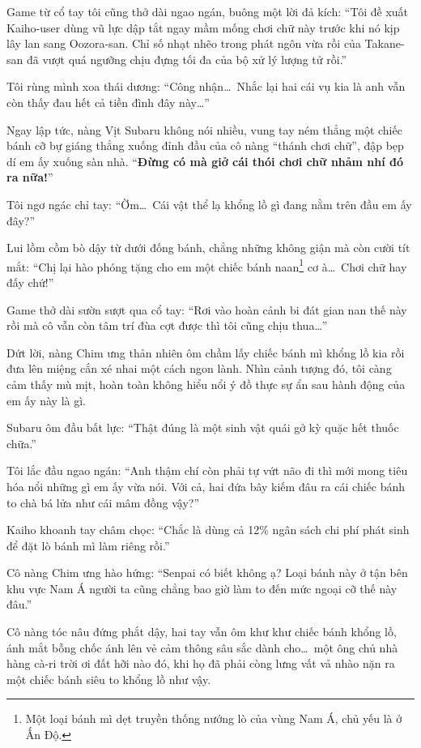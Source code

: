 \documentclass[../main.tex]{subfiles}
\begin{document}
Game từ cổ tay tôi cũng thở dài ngao ngán, buông một lời đả kích: ``Tôi đề xuất Kaiho-user dùng vũ lực dập tắt ngay mầm mống chơi chữ này trước khi nó kịp lây lan sang Oozora-san. Chỉ số nhạt nhẽo trong phát ngôn vừa rồi của Takane-san đã vượt quá ngưỡng chịu đựng tối đa của bộ xử lý lượng tử rồi.''

Tôi rùng mình xoa thái dương: ``Công nhận\dots\ Nhắc lại hai cái vụ kia là anh vẫn còn thấy đau hết cả tiền đình đây này\dots''

Ngay lập tức, nàng Vịt Subaru không nói nhiều, vung tay ném thẳng một chiếc bánh cỡ bự giáng thẳng xuống đỉnh đầu của cô nàng ``thánh chơi chữ'', đập bẹp dí em ấy xuống sàn nhà. ``\textbf{Đừng có mà giở cái thói chơi chữ nhảm nhí đó ra nữa!}''

Tôi ngơ ngác chỉ tay: ``Ờm\dots\ Cái vật thể lạ khổng lồ gì đang nằm trên đầu em ấy đây?''

Lui lồm cồm bò dậy từ dưới đống bánh, chẳng những không giận mà còn cười tít mắt: ``Chị lại hào phóng tặng cho em một chiếc bánh naan\footnote{Một loại bánh mì dẹt truyền thống nướng lò của vùng Nam Á, chủ yếu là ở Ấn Độ.} cơ à\dots\ Chơi chữ hay đấy chứ!''


Game thở dài sườn sượt qua cổ tay: ``Rơi vào hoàn cảnh bi đát gian nan thế này rồi mà cô vẫn còn tâm trí đùa cợt được thì tôi cũng chịu thua\dots''

Dứt lời, nàng Chim ưng thản nhiên ôm chầm lấy chiếc bánh mì khổng lồ kia rồi đưa lên miệng cắn xé nhai một cách ngon lành. Nhìn cảnh tượng đó, tôi càng cảm thấy mù mịt, hoàn toàn không hiểu nổi ý đồ thực sự ẩn sau hành động của em ấy này là gì.

Subaru ôm đầu bất lực: ``Thật đúng là một sinh vật quái gở kỳ quặc hết thuốc chữa.''

Tôi lắc đầu ngao ngán: ``Anh thậm chí còn phải tự vứt não đi thì mới mong tiêu hóa nổi những gì em ấy vừa nói. Với cả, hai đứa bây kiếm đâu ra cái chiếc bánh to chà bá lửa như cái mâm đồng vậy?''

Kaiho khoanh tay châm chọc: ``Chắc là dùng cả 12\% ngân sách chi phí phát sinh để đặt lò bánh mì làm riêng rồi.''

Cô nàng Chim ưng hào hứng: ``Senpai có biết không ạ? Loại bánh này ở tận bên khu vực Nam Á người ta cũng chẳng bao giờ làm to đến mức ngoại cỡ thế này đâu.''

Cô nàng tóc nâu đứng phắt dậy, hai tay vẫn ôm khư khư chiếc bánh khổng lồ, ánh mắt bỗng chốc ánh lên vẻ cảm thông sâu sắc dành cho\dots\ một ông chủ nhà hàng cà-ri trời ơi đất hỡi nào đó, khi họ đã phải còng lưng vất vả nhào nặn ra một chiếc bánh siêu to khổng lồ như vậy.
\end{document}
